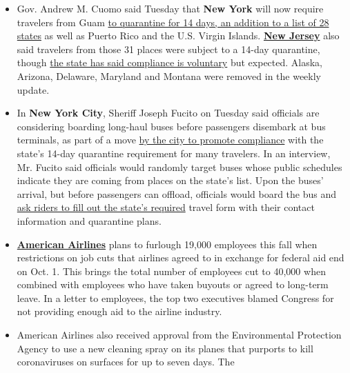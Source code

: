 \begin{itemize}
\item
  Gov. Andrew M. Cuomo said Tuesday that \textbf{New York} will now
  require travelers from Guam
  \href{https://coronavirus.health.ny.gov/covid-19-travel-advisory}{to
  quarantine for 14 days, an addition to a list of 28 states} as well as
  Puerto Rico and the U.S. Virgin Islands.
  \textbf{\href{https://twitter.com/GovMurphy/status/1298283972867379201}{New
  Jersey}} also said travelers from those 31 places were subject to a
  14-day quarantine, though
  \href{https://covid19.nj.gov/faqs/nj-information/travel-and-transportation/which-states-are-on-the-travel-advisory-list-are-there-travel-restrictions-to-or-from-new-jersey}{the
  state has said compliance is voluntary} but expected. Alaska, Arizona,
  Delaware, Maryland and Montana were removed in the weekly update.
\item
  In \textbf{New York City}, Sheriff Joseph Fucito on Tuesday said
  officials are considering boarding long-haul buses before passengers
  disembark at bus terminals, as part of a move
  \href{https://www.nytimes3xbfgragh.onion/2020/08/05/nyregion/nyc-coronavirus-quarantine-checkpoints.html}{by
  the city to promote compliance} with the state's 14-day quarantine
  requirement for many travelers. In an interview, Mr. Fucito said
  officials would randomly target buses whose public schedules indicate
  they are coming from places on the state's list. Upon the buses'
  arrival, but before passengers can offload, officials would board the
  bus and
  \href{https://forms.ny.gov/s3/Welcome-to-New-York-State-Traveler-Health-Form}{ask
  riders to fill out the state's required} travel form with their
  contact information and quarantine plans.
\item
  \textbf{\href{https://www.nytimes3xbfgragh.onion/live/2020/08/25/business/stock-market-today-coronavirus/american-airlines-plans-to-furlough-19000-workers}{American
  Airlines}} plans to furlough 19,000 employees this fall when
  restrictions on job cuts that airlines agreed to in exchange for
  federal aid end on Oct. 1. This brings the total number of employees
  cut to 40,000 when combined with employees who have taken buyouts or
  agreed to long-term leave. In a letter to employees, the top two
  executives blamed Congress for not providing enough aid to the airline
  industry.
\item
  American Airlines also received approval from the Environmental
  Protection Agency to use a new cleaning spray on its planes that
  purports to kill coronaviruses on surfaces for up to seven days. The

\end{itemize}
